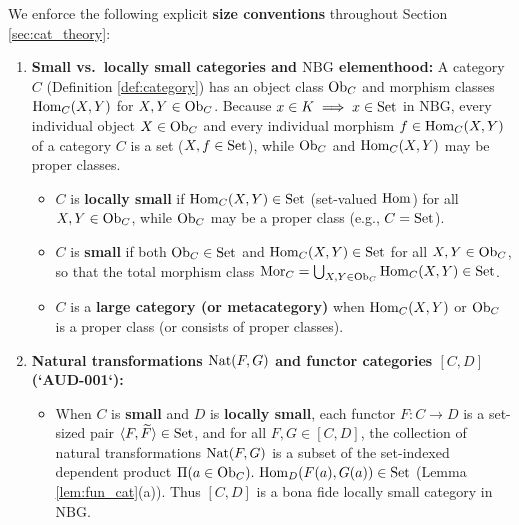 \documentclass[10pt,a4paper]{article}
\begin{document}
We enforce the following explicit \textbf{size conventions} throughout Section \ref{sec:cat_theory}:
\begin{enumerate}
\item \textbf{Small vs.\ locally small categories and $\mathrm{NBG}$ elementhood:} A category $C$ (Definition \ref{def:category}) has an object class ${\textrm{Ob}}_C$ and morphism classes ${\textrm{Hom}}_C(X, Y)$ for $X, Y \in {\textrm{Ob}}_C$. Because $x \in K \implies x \in {\textrm{Set}}$ in $\mathrm{NBG}$, every individual object $X \in {\textrm{Ob}}_C$ and every individual morphism $f \in {\textrm{Hom}}_C(X, Y)$ of a category $C$ is a set ($X, f \in {\textrm{Set}}$), while ${\textrm{Ob}}_C$ and ${\textrm{Hom}}_C(X, Y)$ may be proper classes.
  \begin{itemize}
  \item $C$ is \textbf{locally small} if ${\textrm{Hom}}_C(X, Y) \in {\textrm{Set}}$ (set-valued ${\textrm{Hom}}$) for all $X, Y \in {\textrm{Ob}}_C$, while ${\textrm{Ob}}_C$ may be a proper class (e.g., $C = {\textrm{Set}}$).
  \item $C$ is \textbf{small} if both ${\textrm{Ob}}_C \in {\textrm{Set}}$ and ${\textrm{Hom}}_C(X, Y) \in {\textrm{Set}}$ for all $X, Y \in {\textrm{Ob}}_C$, so that the total morphism class ${\textrm{Mor}}_C = \bigcup_{X,Y \in {\textrm{Ob}}_C} {\textrm{Hom}}_C(X, Y) \in {\textrm{Set}}$.
  \item $C$ is a \textbf{large category (or metacategory)} when ${\textrm{Hom}}_C(X, Y)$ or ${\textrm{Ob}}_C$ is a proper class (or consists of proper classes).
  \end{itemize}
\item \textbf{Natural transformations ${\textrm{Nat}}(F, G)$ and functor categories $[C, D]$ (`AUD-001`):}
  \begin{itemize}
  \item When $C$ is \textbf{small} and $D$ is \textbf{locally small}, each functor $F : C \to D$ is a set-sized pair $\langle F, {\widetilde{F}\textrm{}} \rangle \in {\textrm{Set}}$, and for all $F, G \in [C, D]$, the collection of natural transformations ${\textrm{Nat}}(F, G)$ is a subset of the set-indexed dependent product $\Pi(a \in \Ob_C).\ \Hom_D(F(a), G(a)) \in \Set$ (Lemma \ref{lem:fun_cat}(a)). Thus $[C, D]$ is a bona fide locally small category in $\mathrm{NBG}$.

\end{itemize}
\end{enumerate}
\end{document}
